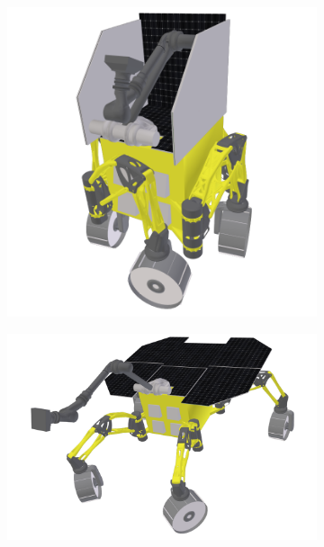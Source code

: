 \begin{figure}[h]
\captionsetup[subfigure]{justification=centering}
\vspace{-2ex}
	\centering
    \setlength{\subfigureWidth}{0.50\textwidth}
    \setlength{\graphicsHeight}{53mm}
    \hypersetup{hidelinks=true}%
    \begin{subfigure}[t]{\subfigureWidth}
        \centering
        \includegraphics[height=\graphicsHeight]{sections/design/solar-array/images/ismenius-cavus-stowed.png}
		\label{fig:sub:solar-array-on-rover-for-ismenius-cavus-stowed}
    \end{subfigure}\hfill
    \begin{subfigure}[t]{\subfigureWidth}
        \centering
        \includegraphics[height=\graphicsHeight]{sections/design/solar-array/images/ismenius-cavus-10deg-pitch.png}

\end{subfigure}
\end{figure}
